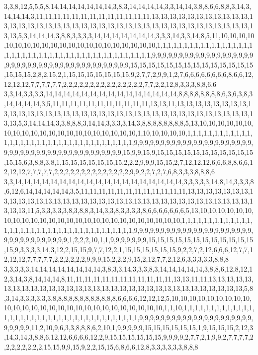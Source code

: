 3,3,8,12,5,5,5,8,14,14,14,14,14,14,14,3,8,3,14,14,14,14,3,3,14,14,3,8,8,6,6,8,8,3,14,3,14,14,14,3,11,11,11,11,11,11,11,11,11,11,11,11,11,13,13,13,13,13,13,13,13,13,13,13,13,13,13,13,13,13,13,13,13,13,13,13,13,13,13,13,13,13,13,13,13,13,13,13,13,13,13,13,13,13,5,3,14,14,14,3,8,8,3,3,3,3,14,14,14,14,14,14,14,3,3,3,14,3,3,14,8,5,11,10,10,10,10,10,10,10,10,10,10,10,10,10,10,10,10,10,10,10,10,10,1,1,1,1,1,1,1,1,1,1,1,1,1,1,1,1,1,1,1,1,1,1,1,1,1,1,1,1,1,1,1,1,1,1,1,1,1,1,1,1,1,1,1,1,1,9,9,9,9,9,9,9,9,9,9,9,9,9,9,9,9,9,9,9,9,9,9,9,9,9,9,9,9,9,9,9,9,9,9,9,9,9,9,9,9,9,9,15,15,15,15,15,15,15,15,15,15,15,15,15,15,15,15,15,2,8,2,15,2,1,15,15,15,15,15,15,15,9,2,7,7,2,9,9,1,2,7,6,6,6,6,6,6,6,6,8,6,6,12,12,12,12,7,7,7,7,7,7,2,2,2,2,2,2,2,2,2,2,2,2,2,2,2,7,7,2,2,12,8,3,3,3,8,8,6,6
3,3,14,3,3,3,3,14,14,14,14,14,14,14,14,14,14,14,14,14,14,14,8,8,8,8,8,8,8,8,6,3,6,3,8,3,14,14,14,14,3,5,11,11,11,11,11,11,11,11,11,11,11,13,13,11,13,13,13,13,13,13,13,13,13,13,13,13,13,13,13,13,13,13,13,13,13,13,13,13,13,13,13,13,13,13,13,13,13,13,13,13,13,13,5,3,14,14,14,3,3,8,8,8,3,14,14,3,3,3,3,14,3,8,8,8,8,8,8,8,8,5,13,10,10,10,10,10,10,10,10,10,10,10,10,10,10,10,10,10,10,10,10,10,1,10,10,10,10,10,1,1,1,1,1,1,1,1,1,1,1,1,1,1,1,1,1,1,1,1,1,1,1,1,1,1,1,1,1,1,1,1,1,1,1,1,9,9,9,9,9,9,9,9,9,9,9,9,9,9,9,9,9,9,9,9,9,9,9,9,9,9,9,9,9,9,9,9,9,9,9,9,9,9,9,9,9,9,9,9,15,9,9,15,9,15,15,15,15,15,15,15,15,15,15,15,15,15,6,3,8,8,3,8,1,15,15,15,15,15,15,15,2,2,2,9,9,9,15,15,2,7,12,12,12,6,6,6,8,8,6,6,12,12,12,7,7,7,7,7,2,2,2,2,2,2,2,2,2,2,2,2,2,2,9,9,2,2,7,2,7,6,8,3,3,3,8,8,8,6
3,3,14,14,14,14,14,14,14,14,14,14,14,14,14,14,14,14,14,14,14,3,3,3,3,3,14,8,14,3,3,3,8,6,12,6,14,14,14,14,14,3,5,11,11,11,11,11,11,11,11,11,11,11,11,13,13,13,13,13,13,13,13,13,13,13,13,13,13,13,13,13,13,13,13,13,13,13,13,13,13,13,13,13,13,13,13,13,13,13,13,13,13,11,5,3,3,3,3,3,8,3,8,8,3,14,3,3,8,3,3,3,3,8,6,6,6,6,6,6,6,5,13,10,10,10,10,10,10,10,10,10,10,10,10,10,10,10,10,10,10,10,10,10,10,10,10,10,10,1,1,1,1,1,1,1,1,1,1,1,1,1,1,1,1,1,1,1,1,1,1,1,1,1,1,1,1,1,1,1,1,1,1,1,1,1,9,9,9,9,9,9,9,9,9,9,9,9,9,9,9,9,9,9,9,9,9,9,9,9,9,9,9,9,9,9,9,9,9,9,1,2,2,2,10,1,1,9,9,9,9,9,9,9,15,15,15,15,15,15,15,15,15,15,15,15,15,9,3,3,3,3,14,3,12,2,15,15,9,7,7,12,2,1,15,15,15,15,15,15,9,2,2,7,2,12,6,6,6,12,7,7,12,12,12,7,7,7,7,7,2,2,2,2,2,2,9,9,9,15,2,2,2,9,15,2,12,7,7,2,12,6,3,3,3,3,3,8,8,8
3,3,3,3,3,14,14,14,14,14,14,14,14,3,8,3,3,14,3,3,3,8,3,14,14,14,14,14,3,8,8,6,12,8,12,12,3,14,3,8,14,14,14,8,11,11,11,11,11,11,11,11,11,11,11,11,13,13,11,11,13,13,13,13,13,13,13,13,13,13,13,13,13,13,13,13,13,13,13,13,13,13,13,13,13,13,13,13,13,13,13,13,5,8,3,14,3,3,3,3,3,3,8,8,8,8,8,8,8,8,8,8,8,8,6,6,6,6,12,12,12,5,10,10,10,10,10,10,10,10,10,10,10,10,10,10,10,10,10,10,10,10,10,10,10,10,10,10,10,1,1,10,1,1,1,1,1,1,1,1,1,1,1,1,1,1,1,1,1,1,1,1,1,1,1,1,1,1,1,1,1,1,1,1,1,1,1,1,1,1,9,9,9,9,9,9,9,9,9,9,9,9,9,9,9,9,9,9,9,9,9,9,9,9,9,9,11,2,10,9,6,3,3,8,8,8,6,2,10,1,9,9,9,9,9,15,15,15,15,15,15,1,9,15,15,15,2,12,3,14,3,14,3,8,8,6,12,12,6,6,6,6,12,2,9,15,15,15,15,15,15,9,9,9,9,2,7,7,2,1,9,9,2,7,7,7,7,2,2,2,2,2,2,2,2,15,15,9,9,15,9,2,2,15,15,6,8,6,6,12,8,3,3,3,3,3,3,8,8,8
